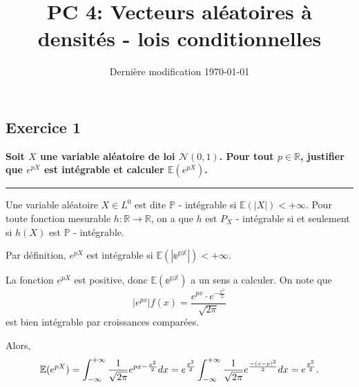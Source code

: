 \documentclass[french]{article}
\begin{document}
	
\title{PC 4: Vecteurs aléatoires à densités - lois conditionnelles}
\date{Dernière modification \today}

\maketitle

\subsection*{Exercice 1}
\textbf{Soit $X$ une variable aléatoire de loi $\mathcal{N}(0,1)$. Pour tout $p \in \mathbb{R}$, justifier que $e^{pX}$ est intégrable et calculer $\mathbb{E}(e^{pX})$.}
\vspace{.3cm}
\hrule
\vspace{.3cm}
{%
	\begin{tcolorbox}[colback=blue!5!white,colframe=blue!75!black]
		Une variable aléatoire $X \in L^0$ est dite $\mathbb{P}$ - intégrable si $\mathbb{E}(|X|) < +\infty$. Pour toute fonction mesurable $h : \mathbb{R} \to \mathbb{R}$, on a que $h$ est $P_X$ - intégrable si et seulement si $h(X)$ est $\mathbb{P}$ - intégrable.
	\end{tcolorbox}

	Par définition, $e^{pX}$ est intégrable si $\mathbb{E(|e^{pX}|)} < +\infty$.
	
	La fonction $e^{pX}$ est positive, donc $\mathbb{E(e^{pX})}$ a un sens a calculer. On note que 
	\begin{equation}
		|e^{px}|f(x) = \frac{e^{px} \cdot e^{-\frac{x^2}{2}} }{\sqrt{2\pi}}
	\end{equation}
	est bien intégrable par croissances comparées.
	
	Alors,
	\begin{dmath}
		\mathbb{E}(e^{pX}) = \int_{-\infty}^{+\infty} \frac{1}{\sqrt{2\pi}} e^{px - \frac{x^2}{2}}dx \\
		= e^{\frac{p^2}{2}} \int_{-\infty}^{+\infty}  \frac{1}{\sqrt{2\pi}} e^{\frac{-(x-p)^2}{2}}dx \\
		=e^{\frac{p^2}{2}}.
	\end{dmath}
}

\newpage
\end{document}
